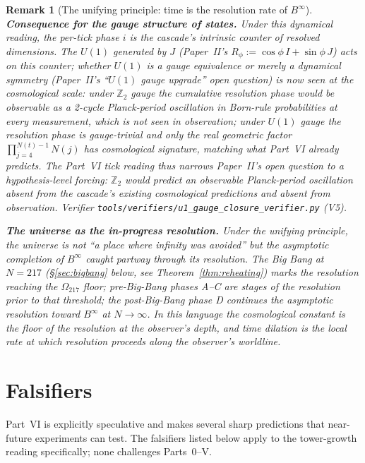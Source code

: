 \documentclass[12pt,a4paper]{article}
\newtheorem*{remark}{Remark}
\begin{document}
\begin{remark}[The unifying principle: time is the resolution rate of $B^\infty$]
\medskip
\noindent\textbf{Consequence for the gauge structure of states.} Under
this dynamical reading, the per-tick phase $i$ is the cascade's intrinsic
counter of resolved dimensions. The $U(1)$ generated by $J$ (Paper~II's
$R_\phi := \cos\phi\,I + \sin\phi\,J$) acts on this counter; whether
$U(1)$ is a gauge equivalence or merely a dynamical symmetry (Paper~II's
``$U(1)$ gauge upgrade'' open question) is now seen at the cosmological
scale: under $\mathbb{Z}_2$ gauge the cumulative resolution phase would
be observable as a 2-cycle Planck-period oscillation in Born-rule
probabilities at every measurement, which is not seen in observation;
under $U(1)$ gauge the resolution phase is gauge-trivial and only the
real geometric factor $\prod_{j=4}^{N(t)-1} N(j)$ has cosmological
signature, matching what Part~VI already predicts. The Part~VI tick
reading thus narrows Paper~II's open question to a hypothesis-level
forcing: $\mathbb{Z}_2$ would predict an observable Planck-period
oscillation absent from the cascade's existing cosmological predictions
and absent from observation. Verifier
\texttt{tools/verifiers/u1\_gauge\_closure\_verifier.py} (V5).

\medskip
\noindent\textbf{The universe as the in-progress resolution.} Under the
unifying principle, the universe is not ``a place where infinity was
avoided'' but the asymptotic completion of $B^\infty$ caught partway
through its resolution. The Big Bang at $N=217$
(\S\ref{sec:bigbang} below, see Theorem~\ref{thm:reheating}) marks the
resolution reaching the $\Omega_{217}$ floor; pre-Big-Bang phases A--C
are stages of the resolution prior to that threshold; the post-Big-Bang
phase D continues the asymptotic resolution toward $B^\infty$ at
$N\to\infty$. In this language the cosmological constant is the floor of
the resolution at the observer's depth, and time dilation is the local
rate at which resolution proceeds along the observer's worldline.
\end{remark}

\section{Falsifiers}
\label{sec:falsifiers}

Part~VI is explicitly speculative and makes several sharp predictions that
near-future experiments can test. The falsifiers listed below apply to the
tower-growth reading specifically; none challenges Parts~0--V.
\end{document}
